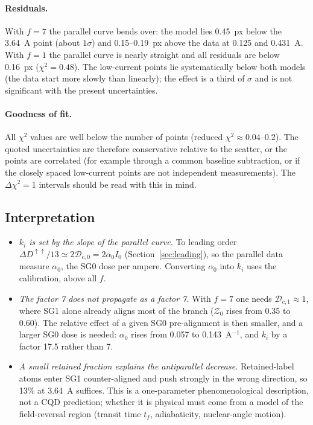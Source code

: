 \documentclass[11pt,a4paper]{article}
\newcommand{\D}{\mathcal{D}}
\newcommand{\Z}{\mathcal{Z}}
\newcommand{\pp}{{\uparrow\uparrow}}
\begin{document}
\paragraph{Residuals.} With $f=7$ the parallel curve bends over: the model lies 0.45~px below the
3.64~A point (about $1\sigma$) and 0.15--0.19~px above the data at 0.125 and 0.431~A. With $f=1$ the
parallel curve is nearly straight and all residuals are below 0.16~px ($\chi^2=0.48$). The
low-current points lie systematically below both models (the data start more slowly than linearly);
the effect is a third of $\sigma$ and is not significant with the present uncertainties.

\paragraph{Goodness of fit.} All $\chi^2$ values are well below the number of points (reduced
$\chi^2\approx0.04$--0.2). The quoted uncertainties are therefore conservative relative to the scatter,
or the points are correlated (for example through a common baseline subtraction, or if the closely
spaced low-current points are not independent measurements). The $\Delta\chi^2=1$ intervals should be
read with this in mind.

\subsection{Interpretation}
\begin{itemize}
\item \emph{$k_i$ is set by the slope of the parallel curve.} To leading order
$\Delta D^\pp/13\simeq2\D_{c,0}=2\alpha_0I_0$ (Section~\ref{sec:leading}), so the parallel data measure
$\alpha_0$, the SG0 dose per ampere. Converting $\alpha_0$ into $k_i$ uses the calibration, above all
$f$.
\item \emph{The factor 7 does not propagate as a factor 7.} With $f=7$ one needs $\D_{c,1}\approx1$,
where SG1 alone already aligns most of the branch ($\Z_0$ rises from 0.35 to 0.60). The relative effect
of a given SG0 pre-alignment is then smaller, and a larger SG0 dose is needed: $\alpha_0$ rises from
0.057 to 0.143~A$^{-1}$, and $k_i$ by a factor 17.5 rather than 7.
\item \emph{A small retained fraction explains the antiparallel decrease.} Retained-label atoms enter
SG1 counter-aligned and push strongly in the wrong direction, so 13\% at 3.64~A suffices. This is a
one-parameter phenomenological description, not a CQD prediction; whether it is physical must come
from a model of the field-reversal region (transit time $t_f$, adiabaticity, nuclear-angle motion).
\end{itemize}
\end{document}

